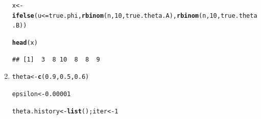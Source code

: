 \documentclass[11pt, a4paper]{article}\usepackage[]{graphicx}\usepackage[]{xcolor}
\makeatletter
\newcommand{\hlnum}[1]{\textcolor[rgb]{0.686,0.059,0.569}{#1}}%
\newcommand{\hlopt}[1]{\textcolor[rgb]{0,0,0}{#1}}%
\newcommand{\hldef}[1]{\textcolor[rgb]{0.345,0.345,0.345}{#1}}%
\newcommand{\hlkwb}[1]{\textcolor[rgb]{0.69,0.353,0.396}{#1}}%
\newcommand{\hlkwd}[1]{\textcolor[rgb]{0.737,0.353,0.396}{\textbf{#1}}}%
\newenvironment{kframe}{%
 \def\at@end@of@kframe{}%
 \ifinner\ifhmode%
  \def\at@end@of@kframe{\end{minipage}}%
  \begin{minipage}{\columnwidth}%
 \fi\fi%
 \def\FrameCommand##1{\hskip\@totalleftmargin \hskip-\fboxsep
 \colorbox{shadecolor}{##1}\hskip-\fboxsep
     \hskip-\linewidth \hskip-\@totalleftmargin \hskip\columnwidth}%
 \MakeFramed {\advance\hsize-\width
   \@totalleftmargin\z@ \linewidth\hsize
   \@setminipage}}%
 {\par\unskip\endMakeFramed%
 \at@end@of@kframe}
\newenvironment{knitrout}{}{} %
\makeatother
\begin{document}
\begin{enumerate}
\begin{knitrout}
\color{fgcolor}\begin{kframe}
\begin{alltt}
\hldef{x} \hlkwb{<-} \hlkwd{ifelse}\hldef{(u} \hlopt{<=} \hldef{true.phi,} \hlkwd{rbinom}\hldef{(n,} \hlnum{10}\hldef{, true.theta.A),} \hlkwd{rbinom}\hldef{(n,} \hlnum{10}\hldef{, true.theta.B))}
\end{alltt}
\end{kframe}
\end{knitrout}

\begin{knitrout}
\color{fgcolor}\begin{kframe}
\begin{alltt}
\hlkwd{head}\hldef{(x)}
\end{alltt}
\begin{verbatim}
## [1]  3  8 10  8  8  9
\end{verbatim}
\end{kframe}
\end{knitrout}

\item[\scalebox{2.0}{\twemoji{keycap: 2}}]

\begin{knitrout}
\color{fgcolor}\begin{kframe}
\begin{alltt}
\hldef{theta} \hlkwb{<-} \hlkwd{c}\hldef{(}\hlnum{0.9}\hldef{,} \hlnum{0.5}\hldef{,} \hlnum{0.6}\hldef{)}
\end{alltt}
\end{kframe}
\end{knitrout}

\begin{knitrout}
\color{fgcolor}\begin{kframe}
\begin{alltt}
\hldef{epsilon} \hlkwb{<-} \hlnum{0.00001}
\end{alltt}
\end{kframe}
\end{knitrout}

\begin{knitrout}
\color{fgcolor}\begin{kframe}
\begin{alltt}
\hldef{theta.history} \hlkwb{<-} \hlkwd{list}\hldef{(); iter} \hlkwb{<-} \hlnum{1}
\end{alltt}
\end{kframe}
\end{knitrout}


\end{enumerate}
\end{document}
